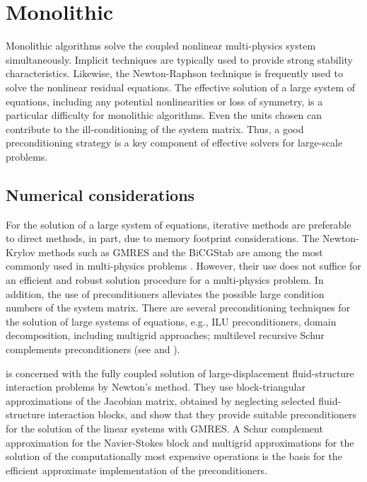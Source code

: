 \section{Monolithic}

Monolithic algorithms solve the coupled nonlinear multi-physics system simultaneously.
Implicit techniques are typically used to provide strong stability characteristics.
Likewise, the Newton-Raphson technique is frequently used to solve the nonlinear residual equations.
The effective solution of a large system of equations, including any potential nonlinearities or loss of symmetry, is a particular difficulty for monolithic algorithms.
Even the units chosen can contribute to the ill-conditioning of the system matrix.
Thus, a good preconditioning strategy is a key component of effective solvers for large-scale problems.

\subsection{Numerical considerations}

For the solution of a large system of equations, iterative methods are preferable to direct methods, in part, due to memory footprint considerations.
The Newton-Krylov methods such as GMRES and the BiCGStab are among the most commonly used in multi-physics problems \citep{hron_monolithic_2006}.
However, their use does not suffice for an efficient and robust solution procedure for a multi-physics problem.
In addition, the use of preconditioners alleviates the possible large condition numbers of the system matrix.
There are several preconditioning techniques for the solution of large systems of equations, e.g., ILU preconditioners, domain decomposition, including multigrid approaches; multilevel recursive Schur complements preconditioners (see \cite{smith_domain_2004} and \cite{chen_matrix_2005}).

\cite{heil_efficient_2004} is concerned with the fully coupled solution of large-displacement fluid-structure interaction problems by Newton's method.
They use block-triangular approximations of the Jacobian matrix, obtained by neglecting selected fluid-structure interaction blocks, and show that they provide suitable preconditioners for the solution of the linear systems with GMRES.
A Schur complement approximation for the Navier-Stokes block and multigrid approximations for the solution of the computationally most expensive operations is the basis for the efficient approximate implementation of the preconditioners.

